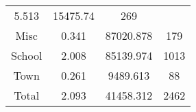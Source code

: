 \documentclass[]{book}
\theoremstyle{definition}
\theoremstyle{definition}
\theoremstyle{definition}
\theoremstyle{remark}
\begin{document}
\begin{longtable}[]{@{}cccc@{}}
\begin{minipage}[t]{0.11\columnwidth}
5.513\strut
\end{minipage} & \begin{minipage}[t]{0.15\columnwidth}\centering\strut
15475.74\strut
\end{minipage} & \begin{minipage}[t]{0.15\columnwidth}\centering\strut
269\strut
\end{minipage}\tabularnewline
\begin{minipage}[t]{0.12\columnwidth}\centering\strut
Misc\strut
\end{minipage} & \begin{minipage}[t]{0.11\columnwidth}\centering\strut
0.341\strut
\end{minipage} & \begin{minipage}[t]{0.15\columnwidth}\centering\strut
87020.878\strut
\end{minipage} & \begin{minipage}[t]{0.15\columnwidth}\centering\strut
179\strut
\end{minipage}\tabularnewline
\begin{minipage}[t]{0.12\columnwidth}\centering\strut
School\strut
\end{minipage} & \begin{minipage}[t]{0.11\columnwidth}\centering\strut
2.008\strut
\end{minipage} & \begin{minipage}[t]{0.15\columnwidth}\centering\strut
85139.974\strut
\end{minipage} & \begin{minipage}[t]{0.15\columnwidth}\centering\strut
1013\strut
\end{minipage}\tabularnewline
\begin{minipage}[t]{0.12\columnwidth}\centering\strut
Town\strut
\end{minipage} & \begin{minipage}[t]{0.11\columnwidth}\centering\strut
0.261\strut
\end{minipage} & \begin{minipage}[t]{0.15\columnwidth}\centering\strut
9489.613\strut
\end{minipage} & \begin{minipage}[t]{0.15\columnwidth}\centering\strut
88\strut
\end{minipage}\tabularnewline
\begin{minipage}[t]{0.12\columnwidth}\centering\strut
Total\strut
\end{minipage} & \begin{minipage}[t]{0.11\columnwidth}\centering\strut
2.093\strut
\end{minipage} & \begin{minipage}[t]{0.15\columnwidth}\centering\strut
41458.312\strut
\end{minipage} & \begin{minipage}[t]{0.15\columnwidth}\centering\strut
2462\strut
\end{minipage}\tabularnewline
\bottomrule
\end{longtable}
\end{document}
